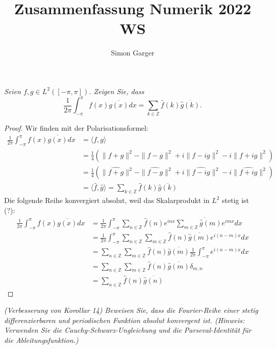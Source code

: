 \documentclass[11pt]{article}
\title{Zusammenfassung Numerik 2022 WS}
\author{Simon Garger}
\newcommand{\Z}{\mathbb{Z}}
\newenvironment{problem}[2][Beispiel]{
    \begin{trivlist}
        \item[\hskip \labelsep {\bfseries #1}\hskip \labelsep {\bfseries #2.}] \itshape}{
    \end{trivlist}\normalshape
}
\begin{document}
    \begin{problem}{1}
        Seien $f, g \in L^2([-\pi, \pi])$. Zeigen Sie, dass
        $$
        \frac{1}{2 \pi} \int_{-\pi}^\pi f(x) \overline{g(x)} d x=\sum_{k \in
        \mathbb{Z}} \hat{f}(k) \overline{\hat{g}(k)} .
        $$
    \end{problem}

    \begin{proof}
        Wir finden mit der Polarisationsformel:
        $$\begin{aligned}
              \frac{1}{2 \pi} \int_{-\pi}^\pi f(x) \overline{g(x)} d x &= \langle f,g\rangle \\
              &= \frac{1}{4}(\|f+g\|^2 - \|f-g\|^2 +i\|f-ig\|^2 - i\|f+ig\|^2)\\
              &= \frac{1}{4}(\|\widehat{f+g}\|^2 - \|\widehat{f-g}\|^2 +i\|\widehat{f-ig}\|^2 - i\|\widehat{f+ig}\|^2)\\
              &= \langle \hat{f}, \hat{g}\rangle =\sum_{k \in
              \mathbb{Z}} \hat{f}(k) \overline{\hat{g}(k)}
        \end{aligned}$$
        Die folgende Reihe konvergiert absolut, weil das Skalarprodukt in
        $L^2 $ stetig ist (?):
        $$\begin{aligned}
              \frac{1}{2 \pi} \int_{-\pi}^\pi f(x) \overline{g(x)} d x &=
              \frac{1}{2 \pi} \int_{-\pi}^\pi\sum_{n\in \Z}\hat{f}(n)e^{inx}
              \overline{\sum_{m\in \Z}\hat{g}(m)e^{imx}}dx\\
              &= \frac{1}{2 \pi} \int_{-\pi}^\pi\sum_{n\in \Z}\sum_{m\in \Z}
              \hat{f}(n)\overline{\hat{g}(m)}e^{i(n-m)x}dx\\
              &= \sum_{n\in \Z}\sum_{m\in \Z}\hat{f}(n)\overline{\hat{g}(m)}\frac{1}{2 \pi}
              \int_{-\pi}^\pi e^{i(n-m)x}dx\\
              &= \sum_{n\in \Z}\sum_{m\in \Z}\hat{f}(n)\overline{\hat{g}(m)}\delta_{m,n}\\
              &= \sum_{n\in \Z}\hat{f}(n)\overline{\hat{g}(n)}
        \end{aligned}$$
    \end{proof}

    \begin{problem}{2}
        (Verbesserung von Korollar 14) Beweisen Sie, dass die Fourier-Reihe einer stetig
        differenzierbaren und periodischen Funktion absolut konvergent ist.
        (Hinweis: Verwenden Sie die Cauchy-Schwarz-Ungleichung und die Parseval-Identität für
        die Ableitungsfunktion.)
    \end{problem}
\end{document}
